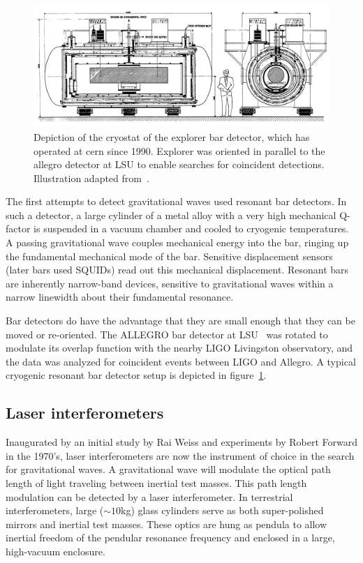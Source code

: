 \begin{figure}
\includegraphics[width=\columnwidth]{chapter1/figures/explorer.png}
\caption[EXPLORER bar detector]{\label{fig:explorer-bar}Depiction of
  the cryostat of the {\sc explorer} bar detector, which has operated
  at {\sc cern} since 1990.  {\sc Explorer} was oriented in parallel
  to the {\sc allegro} detector at LSU\cite{Mauceli1996Allegro} to
  enable searches for coincident detections.  Illustration adapted
  from~\cite{Astone1993Longterm}.}
\end{figure}

The first attempts to detect gravitational waves used resonant bar
detectors\cite{Thorne1980Gravitationalwave,Levine2004Early}.  
In such a detector, a large cylinder of a metal alloy with
a very high mechanical Q-factor is suspended in a vacuum chamber and
cooled to cryogenic temperatures.  A passing gravitational wave
couples mechanical energy into the bar, ringing up the fundamental
mechanical mode of the bar.  Sensitive displacement sensors (later bars used
SQUIDs) read out this mechanical displacement.  Resonant bars are
inherently narrow-band devices, sensitive to gravitational waves
within a narrow linewidth about their fundamental resonance.

Bar detectors do have the advantage that they are small enough that
they can be moved or re-oriented.  The ALLEGRO bar detector at LSU~\cite{Mauceli1996Allegro} was
rotated to modulate its overlap function with the nearby LIGO
Livingston observatory, and the data was analyzed for coincident
events between LIGO and Allegro\cite{Abbott2007First}.
A typical cryogenic resonant bar detector setup is depicted in
figure~\ref{fig:explorer-bar}.

\subsection{Laser interferometers}

Inaugurated by an initial study by Rai
Weiss\cite{Weiss1972Electromagnetically} and experiments by Robert
Forward\cite{Forward1978Wideband} in the 1970's, 
laser interferometers are now the instrument of choice in the search
for gravitational waves.  A gravitational wave will modulate the
optical path length of light traveling between inertial test masses.
This path length modulation can be detected by a laser interferometer.
%
In terrestrial interferometers, large ($\sim10$kg) glass cylinders
serve as both super-polished mirrors and inertial test masses.  These
optics are hung as pendula to allow inertial freedom of the pendular
resonance frequency and enclosed in a large, high-vacuum enclosure.

